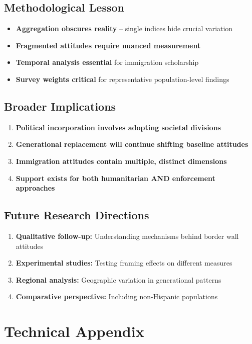 \documentclass[11pt,letterpaper]{article}
\begin{document}
\subsection{Methodological Lesson}
\begin{itemize}
    \item \textbf{Aggregation obscures reality} -- single indices hide crucial variation
    \item \textbf{Fragmented attitudes require nuanced measurement}
    \item \textbf{Temporal analysis essential} for immigration scholarship
    \item \textbf{Survey weights critical} for representative population-level findings
\end{itemize}

\subsection{Broader Implications}
\begin{enumerate}
    \item \textbf{Political incorporation involves adopting societal divisions}
    \item \textbf{Generational replacement will continue shifting baseline attitudes}
    \item \textbf{Immigration attitudes contain multiple, distinct dimensions}
    \item \textbf{Support exists for both humanitarian AND enforcement approaches}
\end{enumerate}

\subsection{Future Research Directions}
\begin{enumerate}
    \item \textbf{Qualitative follow-up:} Understanding mechanisms behind border wall attitudes
    \item \textbf{Experimental studies:} Testing framing effects on different measures
    \item \textbf{Regional analysis:} Geographic variation in generational patterns
    \item \textbf{Comparative perspective:} Including non-Hispanic populations
\end{enumerate}

\section{Technical Appendix}
\end{document}
